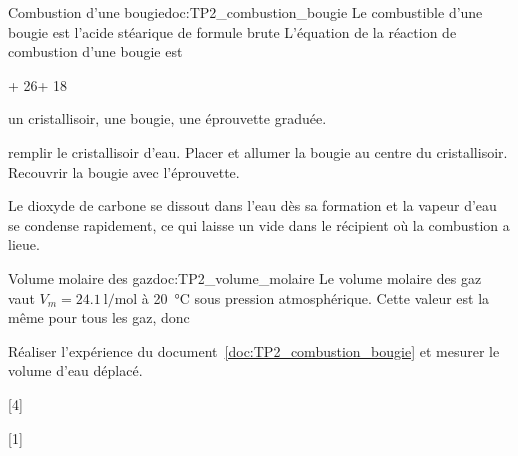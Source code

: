 \begin{doc}{Combustion d'une bougie}{doc:TP2_combustion_bougie}
  Le combustible d'une bougie est l'acide stéarique de formule brute 
  L'équation de la réaction de combustion d'une bougie est
  \begin{center}
    \sol + 26\dioxygene\gaz {}\dioxydeDeCarbone\gaz + 18\eau\gaz
  \end{center}

   un cristallisoir, une bougie, une éprouvette graduée.

   remplir le cristallisoir d'eau.
  Placer et allumer la bougie au centre du cristallisoir.
  Recouvrir la bougie avec l'éprouvette.

  Le dioxyde de carbone se dissout dans l'eau dès sa formation et la vapeur d'eau se condense rapidement, ce qui laisse un vide dans le récipient où la combustion a lieue.
\end{doc}

\begin{doc}{Volume molaire des gaz}{doc:TP2_volume_molaire}
  Le volume molaire des gaz vaut $V_m = \qty{24,1}{\litre\per\mole}$ à \qty{20}{\degreeCelsius} sous pression atmosphérique.
  Cette valeur est la même pour tous les gaz, donc 
\end{doc}

\mesure Réaliser l'expérience du document~\ref{doc:TP2_combustion_bougie} et mesurer le volume d'eau déplacé.

[4]

[1]